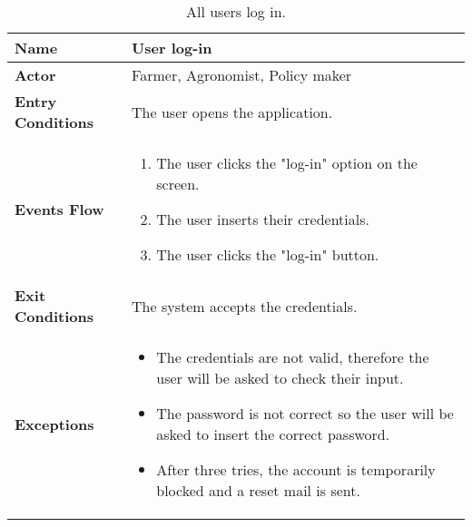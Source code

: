 
\begin{table}[hbt!]
\centering
\small
\caption{\label{tab:userUseLog}All users log in.}

\renewcommand{\arraystretch}{1.25}
\small
\begin{tabular}{|l|>{\raggedright\arraybackslash}m{12cm}|}
    \hline
    \textbf{Name} & User log-in\\
    \hline
   	\textbf{Actor} & Farmer, Agronomist, Policy maker\\
    \hline
    \textbf{Entry Conditions} & The user opens the application.\\
    \hline
    \textbf{Events Flow} & 
    \begin{enumerate}
            \item The user clicks the "log-in" option on the screen.
            \item The user inserts their credentials.
            \item The user clicks the "log-in" button.
     \end{enumerate}\\
    \hline
    \textbf{Exit Conditions} & The system accepts the credentials.\\
    \hline
    \textbf{Exceptions} & 
      \begin{itemize}
      	\item The credentials are not valid, therefore the user will be asked to check their input.
		\item The password is not correct so the user will be asked to insert the correct password. 			\item After three tries, the account is temporarily blocked and a reset mail is sent.
        \end{itemize}
     \\
    \hline
\end{tabular}
\end{table}